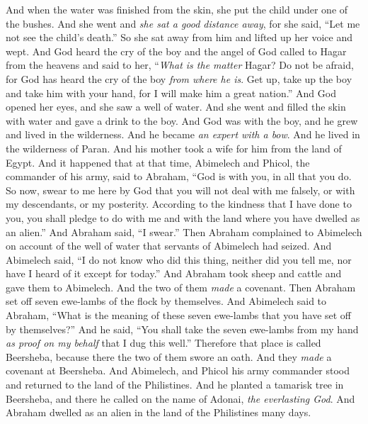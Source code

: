 \begin{biblechapter}
\verse And when the water was finished from the skin, she put the child under one of the bushes.
\verse And she went and \textit{she sat a good distance away}, for she said, “Let me not see the child’s death.” So she sat away from him and lifted up her voice and wept.
\verse And God heard the cry of the boy and the angel of God called to Hagar from the heavens and said to her, “\textit{What is the matter} Hagar? Do not be afraid, for God has heard the cry of the boy \textit{from where he is}.
\verse Get up, take up the boy and take him with your hand, for I will make him a great nation.”
\verse And God opened her eyes, and she saw a well of water. And she went and filled the skin with water and gave a drink to the boy.
\verse And God was with the boy, and he grew and lived in the wilderness. And he became \textit{an expert with a bow}.
\verse And he lived in the wilderness of Paran. And his mother took a wife for him from the land of Egypt.
 And it happened that at that time, Abimelech and Phicol, the commander of his army, said to Abraham, “God is with you, in all that you do.
\verse So now, swear to me here by God that you will not deal with me falsely, or with my descendants, or my posterity. According to the kindness that I have done to you, you shall pledge to do with me and with the land where you have dwelled as an alien.”
\verse And Abraham said, “I swear.”
\verse Then Abraham complained to Abimelech on account of the well of water that servants of Abimelech had seized.
\verse And Abimelech said, “I do not know who did this thing, neither did you tell me, nor have I heard of it except for today.”
\verse And Abraham took sheep and cattle and gave them to Abimelech. And the two of them \textit{made} a covenant.
\verse Then Abraham set off seven ewe-lambs of the flock by themselves.
\verse And Abimelech said to Abraham, “What is the meaning of these seven ewe-lambs that you have set off by themselves?”
\verse And he said, “You shall take the seven ewe-lambs from my hand \textit{as proof on my behalf} that I dug this well.”
\verse Therefore that place is called Beersheba, because there the two of them swore an oath.
\verse And they \textit{made} a covenant at Beersheba. And Abimelech, and Phicol his army commander stood and returned to the land of the Philistines.
\verse And he planted a tamarisk tree in Beersheba, and there he called on the name of Adonai, \textit{the everlasting God}.
\verse And Abraham dwelled as an alien in the land of the Philistines many days.
\end{biblechapter}

